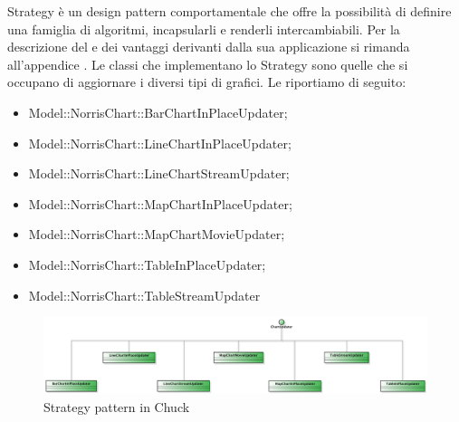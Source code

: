 			Strategy è un design pattern comportamentale che offre la possibilità di definire una famiglia di
algoritmi, incapsularli e renderli intercambiabili. Per la descrizione del  e dei vantaggi derivanti dalla sua applicazione si rimanda all'appendice .
					Le classi che implementano lo Strategy sono quelle che si occupano di aggiornare i diversi tipi di grafici. Le riportiamo di seguito:
					\begin{itemize}
					\item Model::NorrisChart::BarChartInPlaceUpdater;
					\item Model::NorrisChart::LineChartInPlaceUpdater;
					\item Model::NorrisChart::LineChartStreamUpdater;
					\item Model::NorrisChart::MapChartInPlaceUpdater;
					\item Model::NorrisChart::MapChartMovieUpdater;
					\item Model::NorrisChart::TableInPlaceUpdater;
					\item Model::NorrisChart::TableStreamUpdater
				\end{itemize}
				\begin{figure}[H]\centering
	        		\includegraphics[width=\textwidth]{SpecificaTecnica/Pics/DesignPatternNorris/Strategy}
	        		\caption{Strategy pattern in Chuck}
	    		\end{figure}
	    	
